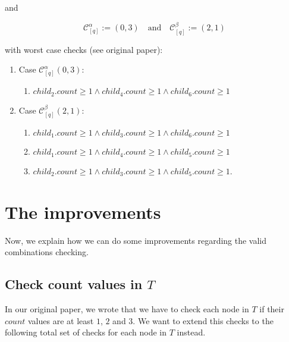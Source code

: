 \documentclass{article}
\newtheorem*{theorem A}{Theorem A}
\newtheorem*{theorem B}{N\"olker's Theorem}
\theoremstyle{remark}
\theoremstyle{remark}
\begin{document}
and 

\begin{equation}
    \mathcal{C}^{\alpha}_{[q]} := \left(0,3\right) \quad \mathrm{and} \quad \mathcal{C}^{\beta}_{[q]} := \left(2,1\right)
\label{eq:ruleCase_02}
\end{equation}

with worst case checks (see original paper):

\begin{enumerate}
    \item Case $\mathcal{C}^{\alpha}_{[q]}\left(0,3\right)$:
        \begin{enumerate}
            \item $child_{2}.count \geq 1 \wedge child_{4}.count \geq 1 \wedge child_{6}.count \geq 1$
        \end{enumerate}

    \item Case $\mathcal{C}^{\beta}_{[q]}\left(2,1\right)$:
        \begin{enumerate}
            \item $child_{1}.count \geq 1 \wedge child_{3}.count \geq 1 \wedge child_{6}.count \geq 1$
            \item $child_{1}.count \geq 1 \wedge child_{4}.count \geq 1 \wedge child_{5}.count \geq 1$
            \item $child_{2}.count \geq 1 \wedge child_{3}.count \geq 1 \wedge child_{5}.count \geq 1$.
        \end{enumerate}
\end{enumerate}
\section{The improvements}
\label{s:theimprovements}
Now, we explain how we can do some improvements regarding the valid combinations checking.
\subsection{Check count values in $T$}
\label{ss:checkcountvaluesinT}
In our original paper, we wrote that we have to check each node in $T$ if their $count$ values are at least $1$, $2$ and $3$. We want to extend this checks to the following total set of checks for each node in $T$ instead.
\end{document}
